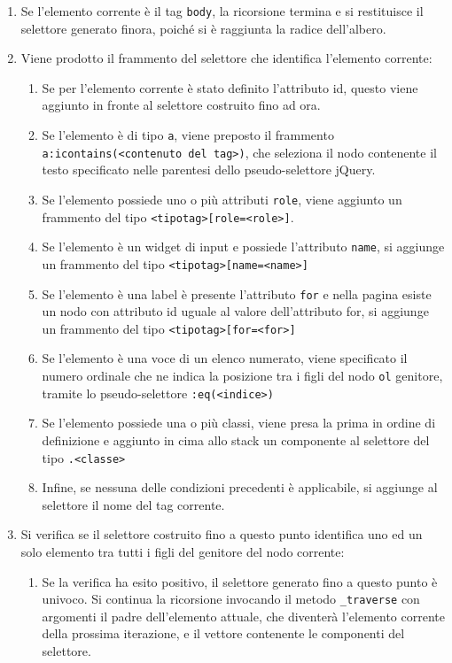 \begin{enumerate}
\item Se l'elemento corrente è il tag \verb|body|, la ricorsione termina e si restituisce il selettore generato finora, poiché si è raggiunta la radice dell'albero.
\item Viene prodotto il frammento del selettore che identifica l'elemento corrente:
	\begin{enumerate}
		\item Se per l'elemento corrente è stato definito l'attributo id, questo viene aggiunto  in fronte al selettore costruito fino ad ora.
		\item Se l'elemento è di tipo \verb|a|, viene preposto il frammento \verb|a:icontains(<contenuto del tag>)|, che seleziona il nodo contenente il testo specificato nelle parentesi dello pseudo-selettore jQuery.
		\item Se l'elemento possiede uno o più attributi \verb|role|, viene aggiunto un frammento del tipo \verb|<tipotag>[role=<role>]|.
		\item Se l'elemento è un widget di input e possiede l'attributo \verb|name|, si aggiunge un frammento del tipo \verb|<tipotag>[name=<name>]|
		\item Se l'elemento è una label è presente l'attributo \verb|for| e nella pagina esiste un nodo con attributo id uguale al valore dell'attributo for, si aggiunge un frammento del tipo \verb|<tipotag>[for=<for>]| 
		\item Se l'elemento è una voce di un elenco numerato, viene specificato il numero ordinale che ne indica la posizione tra i figli del nodo \verb|ol| genitore, tramite lo pseudo-selettore \verb|:eq(<indice>)|
		\item Se l'elemento possiede una o più classi, viene presa la prima in ordine di definizione e aggiunto in cima allo stack un componente al selettore del tipo \verb|.<classe>|
		\item Infine, se nessuna delle condizioni precedenti è applicabile, si aggiunge al selettore il nome del tag corrente.
	\end{enumerate}
\item Si verifica se il selettore costruito fino a questo punto identifica uno ed un solo elemento tra tutti i figli del genitore del nodo corrente:
	\begin{enumerate}
		\item Se la verifica ha esito positivo, il selettore generato fino a questo punto è univoco. Si continua la ricorsione invocando il metodo \verb|_traverse| con argomenti il padre dell'elemento attuale, che diventerà l'elemento corrente della prossima iterazione, e il vettore contenente le componenti del selettore.

\end{enumerate}
\end{enumerate}

